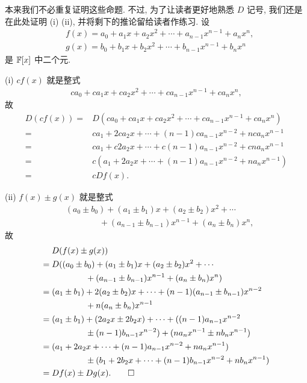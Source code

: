 \begin{pf}
    本来我们不必重复证明这些命题. 不过, 为了让读者更好地熟悉 $D$ 记号, 我们还是在此处证明 (i) (ii), 并将剩下的推论留给读者作练习. 设
    \begin{align*}
         & f(x) = a_0 + a_1 x + a_2 x^2 + \cdots + a_{n-1} x^{n-1} + a_n x^n, \\
         & g(x) = b_0 + b_1 x + b_2 x^2 + \cdots + b_{n-1} x^{n-1} + b_n x^n
    \end{align*}
    是 $\mathbb{F}[x]$ 中二个元.

    (i) $cf(x)$ 就是整式
    \begin{align*}
        ca_0 + ca_1 x + ca_2 x^2 + \cdots + ca_{n-1} x^{n-1} + ca_n x^n,
    \end{align*}
    故
    \begin{align*}
        D(cf(x))
        = {} & D(ca_0 + ca_1 x + ca_2 x^2 + \cdots + ca_{n-1} x^{n-1} + ca_n x^n) \\
        = {} & ca_1 + 2ca_2 x + \cdots + (n-1)ca_{n-1} x^{n-2} + nca_n x^{n-1}    \\
        = {} & ca_1 + c2a_2 x + \cdots + c(n-1)a_{n-1} x^{n-2} + cna_n x^{n-1}    \\
        = {} & c(a_1 + 2a_2 x + \cdots + (n-1)a_{n-1} x^{n-2} + na_n x^{n-1})     \\
        = {} & cDf(x).
    \end{align*}

    (ii) $f(x) \pm g(x)$ 就是整式
    \begin{align*}
         & (a_0 \pm b_0) + (a_1 \pm b_1) x + (a_2 \pm b_2) x^2 + \cdots       \\
         & \qquad \qquad + (a_{n-1} \pm b_{n-1}) x^{n-1} + (a_n \pm b_n) x^n,
    \end{align*}
    故
    \begin{align*}
             & D(f(x) \pm g(x))                                                                \\
        = {} & D((a_0 \pm b_0) + (a_1 \pm b_1) x + (a_2 \pm b_2) x^2 + \cdots                  \\
             & \qquad \qquad + (a_{n-1} \pm b_{n-1}) x^{n-1} + (a_n \pm b_n) x^n)              \\
        = {} & (a_1 \pm b_1) + 2(a_2 \pm b_2) x + \cdots + (n-1) (a_{n-1} \pm b_{n-1}) x^{n-2} \\
             & \qquad \qquad + n (a_n \pm b_n) x^{n-1}                                         \\
        = {} & (a_1 \pm b_1) + (2a_2 x \pm 2b_2 x) + \cdots + ((n-1)a_{n-1} x^{n-2}            \\
             & \qquad \qquad \pm (n-1)b_{n-1} x^{n-2})
        + (na_n x^{n-1} \pm nb_n x^{n-1})                                                      \\
        = {} & (a_1 + 2a_2 x + \cdots + (n-1)a_{n-1} x^{n-2} + na_n x^{n-1})                   \\
             & \qquad \qquad \pm (b_1 + 2b_2 x + \cdots + (n-1)b_{n-1} x^{n-2} + nb_n x^{n-1}) \\
        = {} & Df(x) \pm Dg(x). \qedhere
    \end{align*}
\end{pf}

